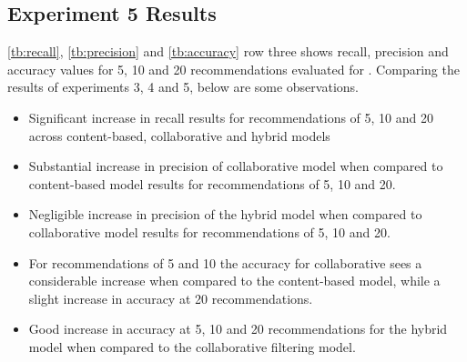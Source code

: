 \subsection{Experiment 5 Results}
\autoref{tb:recall}, \autoref{tb:precision} and \autoref{tb:accuracy} row three shows recall, precision and accuracy values for 5, 10 and 20 recommendations evaluated for . Comparing the results of experiments 3, 4 and 5, below are some observations.
\begin{itemize}
\item Significant increase in recall results for recommendations of 5, 10 and 20 across content-based, collaborative and hybrid models
\item Substantial increase in precision of collaborative model when compared to content-based model results for recommendations of 5, 10 and 20.
\item Negligible increase in precision of the hybrid model when compared to collaborative model results for recommendations of 5, 10 and 20.
\item For recommendations of 5 and 10 the accuracy for collaborative sees a considerable increase when compared to the content-based model, while a slight increase in accuracy at 20 recommendations.
\item Good increase in accuracy at 5, 10 and 20 recommendations for the hybrid model when compared to the collaborative filtering model.
\end{itemize}


